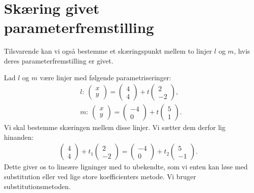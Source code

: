 \section*{Skæring givet parameterfremstilling}
Tilsvarende kan vi også bestemme et skæringspunkt mellem to linjer $l$ og $m$, hvis deres parameterfremstilling er givet. 
\begin{exa}
	Lad $l$ og $m$ være linjer med følgende parametriseringer:
	\begin{align*}
		&l: \ 
		\begin{pmatrix}
			x \\ y
		\end{pmatrix} = 
		\begin{pmatrix}
			4 \\ 4
		\end{pmatrix} + t
		\begin{pmatrix}
			2 \\ -2
		\end{pmatrix},\\
		&m: \ 
		\begin{pmatrix}
			x \\ y 
		\end{pmatrix} = 
		\begin{pmatrix}
			-4 \\ 0
		\end{pmatrix} + t
		\begin{pmatrix}
			5 \\ 1
		\end{pmatrix}.
	\end{align*}
	Vi skal bestemme skæringen mellem disse linjer. Vi sætter dem derfor lig hinanden:
	\begin{align*}
		\begin{pmatrix}
			4 \\ 4
		\end{pmatrix} + t_1
		\begin{pmatrix}
			2 \\ -2
		\end{pmatrix} =
		\begin{pmatrix}
			-4 \\ 0
		\end{pmatrix} + t_2
		\begin{pmatrix}
			5 \\ -1
		\end{pmatrix}.
	\end{align*}
	Dette giver os to lineære ligninger med to ubekendte, som vi enten kan løse med 
	substitution eller ved lige store koefficienters metode. Vi bruger substitutionsmetoden. 

\end{exa}
